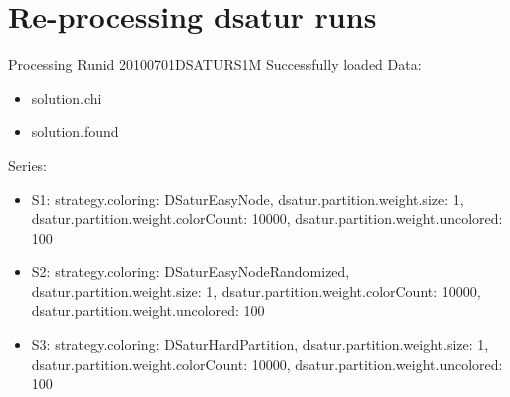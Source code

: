 \documentclass[landscape, 12pt]{report}
\begin{document}
 
\clearpage

\section{Re-processing dsatur runs}

Processing Runid 20100701DSATURS1M
 Successfully loaded
Data:
\begin{itemize}
\item solution.chi
\item solution.found
\end{itemize}
Series:
\begin{itemize}
\item S1: strategy.coloring: DSaturEasyNode, dsatur.partition.weight.size: 1, dsatur.partition.weight.colorCount: 10000, dsatur.partition.weight.uncolored: 100
\item S2: strategy.coloring: DSaturEasyNodeRandomized, dsatur.partition.weight.size: 1, dsatur.partition.weight.colorCount: 10000, dsatur.partition.weight.uncolored: 100
\item S3: strategy.coloring: DSaturHardPartition, dsatur.partition.weight.size: 1, dsatur.partition.weight.colorCount: 10000, dsatur.partition.weight.uncolored: 100
\end{itemize}
\end{document}
